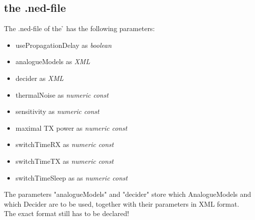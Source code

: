 



\subsection{the .ned-file}

The .ned-file of the \h{\bp} has the following parameters:

\begin{itemize}
\item usePropagationDelay as \textit{boolean}
\item analogueModels as
\textit{XML}
\item decider as \textit{XML}
\item thermalNoise as \textit{numeric const}
\item sensitivity as \textit{numeric const}
\item maximal TX power as \textit{numeric const}
\item switchTimeRX as \textit{numeric const}
\item switchTimeTX as \textit{numeric const}
\item switchTimeSleep as as \textit{numeric const}
\end{itemize}

The parameters "analogueModels" and "decider" store which AnalogueModels and
which Decider are to be used, together with their parameters in XML format. The
exact format still has to be declared!

